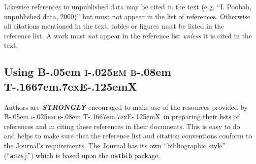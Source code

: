 \documentclass[times, doublespace]{anzsauth}
\newcommand\BibTeX{{\rmfamily B\kern-.05em \textsc{i\kern-.025em b}\kern-.08em
T\kern-.1667em\lower.7ex\hbox{E}\kern-.125emX}}
\begin{document}
Likewise references to unpublished data may be cited in the text
(e.g. ``I. Poobah, unpublished data, 2000)'' but must not appear in
the list of references.  Otherwise all citations mentioned in the
text, tables or figures must be listed in the reference list. A
work must \emph{not} appear in the reference list \emph{unless}
it is cited in the text.

\subsection{Using \BibTeX}
\label{sec:useBib}

Authors are \textbf{\textit{STRONGLY}} encouraged to make use of
the resources provided by \BibTeX\ in preparing their lists of references
and in citing these references in their documents.  This is easy
to do and helps to make sure that the reference list and citation
conventions conform to the Journal's requirements.  The Journal
has its own ``bibliographic style'' (``\texttt{anzsj}'') which is
based upon the \texttt{natbib} package.
\end{document}
